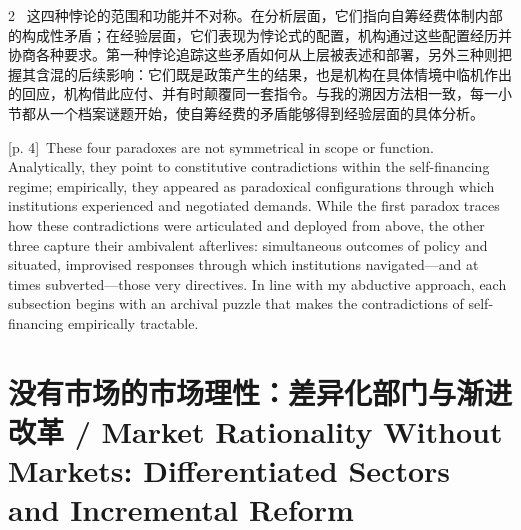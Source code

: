 \documentclass[10pt,a4paper]{article}
\begin{document}
\begin{paracol}{2}
\switchcolumn*
{\scriptsize\color{gray} [p. 4]}\ 这四种悖论的范围和功能并不对称。在分析层面，它们指向自筹经费体制内部的构成性矛盾；在经验层面，它们表现为悖论式的配置，机构通过这些配置经历并协商各种要求。第一种悖论追踪这些矛盾如何从上层被表述和部署，另外三种则把握其含混的后续影响：它们既是政策产生的结果，也是机构在具体情境中临机作出的回应，机构借此应付、并有时颠覆同一套指令。与我的溯因方法相一致，每一小节都从一个档案谜题开始，使自筹经费的矛盾能够得到经验层面的具体分析。\par
\switchcolumn
{\scriptsize\color{gray} [p. 4]}\ These four paradoxes are not symmetrical in scope or function. Analytically, they point to constitutive contradictions within the self-financing regime; empirically, they appeared as paradoxical configurations through which institutions experienced and negotiated demands. While the first paradox traces how these contradictions were articulated and deployed from above, the other three capture their ambivalent afterlives: simultaneous outcomes of policy and situated, improvised responses through which institutions navigated—and at times subverted—those very directives. In line with my abductive approach, each subsection begins with an archival puzzle that makes the contradictions of self-financing empirically tractable.\par
\switchcolumn*
\end{paracol}
\section*{没有市场的市场理性：差异化部门与渐进改革 / Market Rationality Without Markets: Differentiated Sectors and Incremental Reform}
\end{document}
